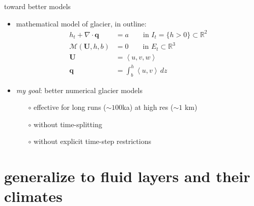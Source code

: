 \documentclass[xcolor={dvipsnames}]{beamer}
\newcommand\bq{\mathbf{q}}
\newcommand\bU{\mathbf{U}}
\newcommand\RR{\mathbb{R}}
\newcommand\Div{\nabla\cdot}
\begin{document}
\begin{frame}{toward better models}

\begin{itemize}
\item mathematical model of glacier, in outline:
\begin{align*}
h_t + \Div\bq &= a \qquad \text{in } I_t = \{h>0\} \subset \RR^2 \\
\mathcal{M}(\bU,h,b) &= 0 \qquad \text{in } E_t \subset \RR^3 \\
\bU &= \left<u,v,w\right> \\
\bq &= \int_b^h \left<u,v\right>\,dz
\end{align*}

\medskip
\item \emph{my goal}: better numerical glacier models
  \begin{itemize}
  \item[$\circ$] effective for long runs ($\sim 100$ka) at high res ($\sim 1$ km) 
  \item[$\circ$] without time-splitting 
  \item[$\circ$] without explicit time-step restrictions 
  \end{itemize}
\end{itemize}
\end{frame}



\section{generalize to fluid layers and their climates}
\end{document}
